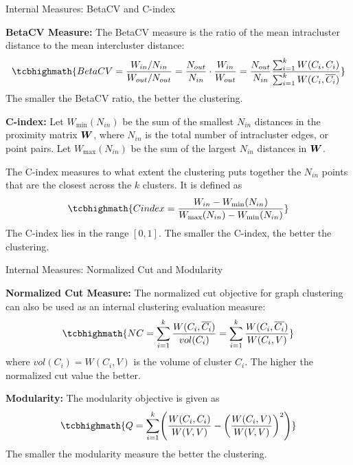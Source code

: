 \begin{frame}{Internal Measures: BetaCV and C-index}

{\bf BetaCV Measure:} The BetaCV measure is the
ratio of the mean intracluster distance to the mean intercluster
distance:
\begin{align*}
\tcbhighmath{
  BetaCV = \frac{W_{in}/N_{in}}{W_{out}/N_{out}} =
  \frac{N_{out}}{N_{in}} \cdot \frac{W_{in}}{W_{out}}
  = \frac{N_{out}}{N_{in}}
  \frac{\sum_{i=1}^k W(C_i, C_i)}{\sum_{i=1}^k
  W(C_i, \ol{C_i})}
}
\end{align*}
The smaller the BetaCV ratio, the better the clustering.

\bigskip
{\bf C-index:} Let $W_{\min}(N_{in})$ be the sum of the
smallest $N_{in}$ distances in the proximity matrix ${\boldsymbol W}$, where
$N_{in}$ is the total number of intracluster edges, or point
pairs. Let $W_{\max}(N_{in})$ be the sum of the largest $N_{in}$
distances in ${\boldsymbol W}$.

\smallskip
The C-index measures to what extent the clustering puts together the
$N_{in}$
points that are the closest across the $k$ clusters.
It is def\/{i}ned as
\begin{align*}
\tcbhighmath{
  Cindex = \frac{W_{in} -
  W_{\min}(N_{in})}{W_{\max}(N_{in})-W_{\min}(N_{in})}
}
\end{align*}
The C-index lies in the range $[0,1]$.
The smaller the C-index, the better the clustering.
\end{frame}


\begin{frame}{Internal Measures: Normalized Cut and Modularity}

  {\bf Normalized Cut Measure:} The normalized cut
objective for graph clustering can
also be used as an internal clustering evaluation measure:
\begin{align*}
\tcbhighmath{
NC = \sum_{i=1}^k {W(C_i, \ol{C_i}) \over vol(C_i)} =
\sum_{i=1}^k {W(C_i, \ol{C_i}) \over W(C_i, V)}
}
\end{align*}
where $vol(C_i) = W(C_i,V)$ is the volume of cluster $C_i$.
The higher the normalized cut value the better.

\bigskip
{\bf Modularity:}
The modularity objective is given as
\begin{align*}
\tcbhighmath{
Q = \sum_{i=1}^k \Biggl(
    {W(C_i,C_i) \over W(V,V)} -
    \lB({W(C_i,V) \over W(V,V)}\rB)^2
    \Biggr)
}
\end{align*}
The smaller the modularity measure the better the clustering.
\end{frame}


